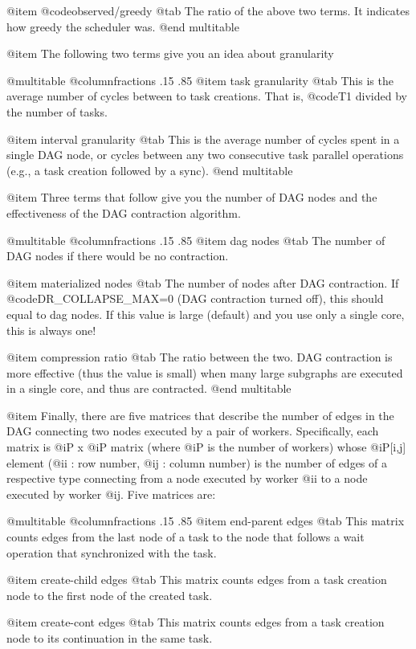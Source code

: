 @item @code{observed/greedy} @tab 
The ratio of the above two terms.
It indicates how greedy the scheduler was.
@end multitable

@item The following two terms give you an idea about granularity

@multitable @columnfractions .15 .85
@item task granularity @tab 
This is the average number of cycles
between to task creations.  That is, @code{T1} divided by
the number of tasks.

@item interval granularity @tab
This is the average number of cycles spent in a single DAG node,
or cycles between any two consecutive
task parallel operations (e.g., a task creation followed by a sync).
@end multitable

@item Three terms that follow give you the number of DAG nodes
and the effectiveness of the DAG contraction algorithm.

@multitable @columnfractions .15 .85
@item dag nodes @tab 
The number of DAG nodes if there would be no 
contraction.

@item materialized nodes @tab 
The number of nodes after DAG contraction.
If @code{DR_COLLAPSE_MAX=0} (DAG contraction turned off), this should
equal to dag nodes.  If this value is large (default) and you use
only a single core, this is always one!

@item compression ratio @tab
The ratio between the two.  DAG contraction
is more effective (thus the value is small) when many large subgraphs
are executed in a single core, and thus are contracted.
@end multitable

@item Finally, there are five matrices that describe the number of edges
in the DAG connecting two nodes executed by a pair of workers.
Specifically, each matrix is @i{P} x @i{P} matrix (where @i{P} is the
number of workers) whose @i{P[i,j]} element (@i{i} : row number, @i{j} :
column number) is the number of edges of a respective type connecting
from a node executed by worker @i{i} to a node executed by worker @i{j}.
Five matrices are:

@multitable @columnfractions .15 .85
@item end-parent edges @tab
This matrix counts edges
from the last node of a task to the node that follows a wait
operation that synchronized with the task.

@item create-child edges @tab 
This matrix counts edges
from a task creation node to the first node of the created task.

@item create-cont edges @tab 
This matrix counts edges from
a task creation node to its continuation in the same task.

